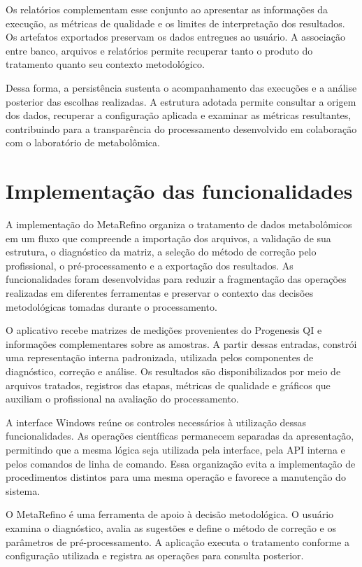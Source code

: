 Os relatórios complementam esse conjunto ao apresentar as informações da execução, as métricas de qualidade e os limites de interpretação dos resultados. Os artefatos exportados preservam os dados entregues ao usuário. A associação entre banco, arquivos e relatórios permite recuperar tanto o produto do tratamento quanto seu contexto metodológico.

Dessa forma, a persistência sustenta o acompanhamento das execuções e a análise posterior das escolhas realizadas. A estrutura adotada permite consultar a origem dos dados, recuperar a configuração aplicada e examinar as métricas resultantes, contribuindo para a transparência do processamento desenvolvido em colaboração com o laboratório de metabolômica.


\section{Implementação das funcionalidades}
\label{sec:implementacao-funcionalidades}

A implementação do MetaRefino organiza o tratamento de dados metabolômicos em um fluxo que compreende a importação dos arquivos, a validação de sua estrutura, o diagnóstico da matriz, a seleção do método de correção pelo profissional, o pré-processamento e a exportação dos resultados. As funcionalidades foram desenvolvidas para reduzir a fragmentação das operações realizadas em diferentes ferramentas e preservar o contexto das decisões metodológicas tomadas durante o processamento.

O aplicativo recebe matrizes de medições provenientes do Progenesis QI e informações complementares sobre as amostras. A partir dessas entradas, constrói uma representação interna padronizada, utilizada pelos componentes de diagnóstico, correção e análise. Os resultados são disponibilizados por meio de arquivos tratados, registros das etapas, métricas de qualidade e gráficos que auxiliam o profissional na avaliação do processamento.

A interface Windows reúne os controles necessários à utilização dessas funcionalidades. As operações científicas permanecem separadas da apresentação, permitindo que a mesma lógica seja utilizada pela interface, pela API interna e pelos comandos de linha de comando. Essa organização evita a implementação de procedimentos distintos para uma mesma operação e favorece a manutenção do sistema.

O MetaRefino é uma ferramenta de apoio à decisão metodológica. O usuário examina o diagnóstico, avalia as sugestões e define o método de correção e os parâmetros de pré-processamento. A aplicação executa o tratamento conforme a configuração utilizada e registra as operações para consulta posterior.

